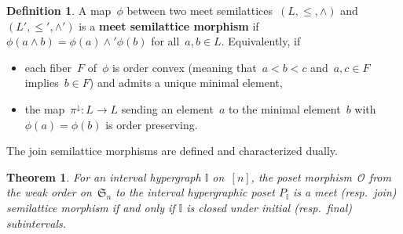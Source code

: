 \documentclass{amsart}
\newtheorem{theoremA}{Theorem}
\theoremstyle{definition}
\newtheorem{definition}[theorem]{Definition}
\newcommand{\defn}[1]{\textbf{\textsf{\color{PineGreen} #1}}} %
\newcommand{\fS}{\mathfrak{S}} %
\newcommand{\meet}{\wedge} %
\newcommand{\projDown}{\pi^\downarrow} %
\newcommand{\Or}{\mathcal O}  %
\newcommand{\II}{\mathbb I} %
\begin{document}
\begin{definition}
A map~$\phi$ between two meet semilattices~$(L, \le, \meet)$ and~$(L', \le', \meet')$ is a \defn{meet semilattice morphism} if~$\phi(a \meet b) = \phi(a) \meet' \phi(b)$ for all~$a,b \in L$.
Equivalently, if
\begin{itemize}
\item each fiber~$F$ of~$\phi$ is order convex (meaning that~$a < b < c$ and~$a,c \in F$ implies~$b \in F$) and admits a unique minimal element,
\item the map~$\projDown : L \to L$ sending an element~$a$ to the minimal element~$b$ with~$\phi(a) = \phi(b)$ is order preserving.
\end{itemize}
The join semilattice morphisms are defined and characterized dually.
\end{definition}

\begin{theoremA}
For an interval hypergraph $\II$ on~$[n]$, the poset morphism~$\Or$ from the weak order on~$\fS_n$ to the interval hypergraphic poset $P_\II$ is a meet (resp.~join) semilattice morphism if and only if $\II$ is closed under initial (resp.~final) subintervals.
\end{theoremA}
\end{document}
